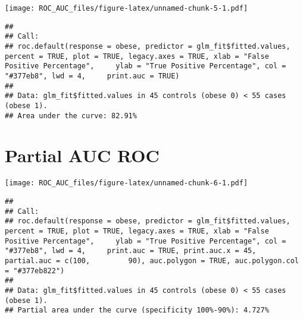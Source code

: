 \documentclass[]{article}
\newenvironment{Shaded}{\begin{snugshade}}{\end{snugshade}}
\newcommand{\KeywordTok}[1]{\textcolor[rgb]{0.13,0.29,0.53}{\textbf{#1}}}
\newcommand{\DataTypeTok}[1]{\textcolor[rgb]{0.13,0.29,0.53}{#1}}
\newcommand{\DecValTok}[1]{\textcolor[rgb]{0.00,0.00,0.81}{#1}}
\newcommand{\StringTok}[1]{\textcolor[rgb]{0.31,0.60,0.02}{#1}}
\newcommand{\OtherTok}[1]{\textcolor[rgb]{0.56,0.35,0.01}{#1}}
\newcommand{\OperatorTok}[1]{\textcolor[rgb]{0.81,0.36,0.00}{\textbf{#1}}}
\newcommand{\NormalTok}[1]{#1}
\begin{document}
\texttt{[image: ROC\_AUC\_files/figure-latex/unnamed-chunk-5-1.pdf]}

\begin{verbatim}
## 
## Call:
## roc.default(response = obese, predictor = glm_fit$fitted.values,     percent = TRUE, plot = TRUE, legacy.axes = TRUE, xlab = "False Positive Percentage",     ylab = "True Positive Percentage", col = "#377eb8", lwd = 4,     print.auc = TRUE)
## 
## Data: glm_fit$fitted.values in 45 controls (obese 0) < 55 cases (obese 1).
## Area under the curve: 82.91%
\end{verbatim}

\section{Partial AUC ROC}\label{partial-auc-roc}

\begin{Shaded}
\end{Shaded}

\texttt{[image: ROC\_AUC\_files/figure-latex/unnamed-chunk-6-1.pdf]}

\begin{verbatim}
## 
## Call:
## roc.default(response = obese, predictor = glm_fit$fitted.values,     percent = TRUE, plot = TRUE, legacy.axes = TRUE, xlab = "False Positive Percentage",     ylab = "True Positive Percentage", col = "#377eb8", lwd = 4,     print.auc = TRUE, print.auc.x = 45, partial.auc = c(100,         90), auc.polygon = TRUE, auc.polygon.col = "#377eb822")
## 
## Data: glm_fit$fitted.values in 45 controls (obese 0) < 55 cases (obese 1).
## Partial area under the curve (specificity 100%-90%): 4.727%
\end{verbatim}
\end{document}
